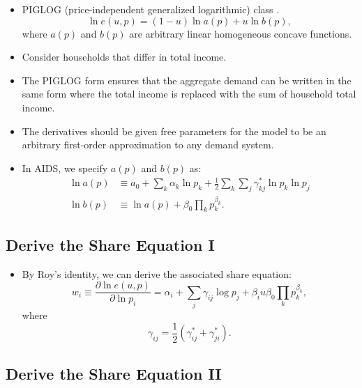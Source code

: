 \documentclass[
]{book}
\providecommand{\tightlist}{%
  \setlength{\itemsep}{0pt}\setlength{\parskip}{0pt}}
\begin{document}
\begin{itemize}
\tightlist
\item
  PIGLOG (price-independent generalized logarithmic) class \citep{Muellbauer1976}.
  \begin{equation}
  \ln e(u, p) = (1 - u) \ln a(p) + u\ln b(p),
  \end{equation}
  where \(a(p)\) and \(b(p)\) are arbitrary linear homogeneous concave functions.
\item
  Consider households that differ in total income.
\item
  The PIGLOG form ensures that the aggregate demand can be written in the same form where the total income is replaced with the sum of household total income.
\item
  The derivatives should be given free parameters for the model to be an arbitrary first-order approximation to any demand system.
\item
  In AIDS, we specify \(a(p)\) and \(b(p)\) as:
  \begin{equation}
  \begin{split}
  \ln a(p) &\equiv a_0 + \sum_{k} \alpha_k \ln p_k + \frac{1}{2}\sum_{k} \sum_{j} \gamma_{kj}^* \ln p_k \ln p_j\\
  \ln b(p) &\equiv \ln a(p) + \beta_0  \prod_{k} p_k^{\beta_k}.
  \end{split}
  \end{equation}
\end{itemize}

\hypertarget{derive-the-share-equation-i}{%
\subsection{Derive the Share Equation I}\label{derive-the-share-equation-i}}

\begin{itemize}
\tightlist
\item
  By Roy's identity, we can derive the associated share equation:
  \begin{equation}
  w_i \equiv \frac{\partial \ln e(u, p)}{\partial \ln p_i} = \alpha_i + \sum_{j} \gamma_{ij} \log p_j + \beta_i u \beta_0 \prod_{k} p_k^{\beta_k},
  \end{equation}
  where
  \begin{equation}
  \gamma_{ij} = \frac{1}{2}(\gamma_{ij}^* + \gamma_{ji}^*).
  \end{equation}
\end{itemize}

\hypertarget{derive-the-share-equation-ii}{%
\subsection{Derive the Share Equation II}\label{derive-the-share-equation-ii}}
\end{document}
